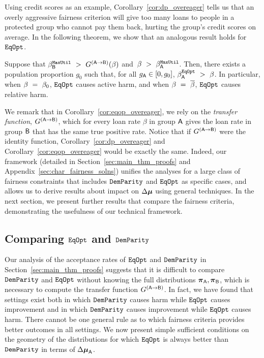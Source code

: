 Using credit scores as an example, Corollary~\ref{cor:dp_overeager} tells us that an overly aggressive fairness criterion will give too many loans to people in a protected group who cannot pay them back, hurting the group's credit scores on average. In the following theorem, we show that an analogous result holds for $\mathtt{EqOpt}$.

\begin{cor} \label{cor:eqop_overeager} Suppose that $\beta_{\mathsf{B}}^{\mathtt{MaxUtil}}~>~G^{(\mathsf{A}\to\mathsf{B})}(\beta)$ and~$\beta~>~\beta_{\mathsf{A}}^{\mathtt{MaxUtil}}$. Then, there exists a population proportion $g_0$ such that, for all $g_{\mathsf{A}}  \in [0,g_0]$, $\beta^{\mathtt{EqOpt}}_{\mathsf{A}}~>~\beta$. In particular, when $\beta~=~\beta_0$, $\mathtt{EqOpt}$ causes active harm, and when $\beta~=~\overline{\beta}$, $\mathtt{EqOpt}$ causes relative harm.
\end{cor} 

We remark that in Corollary~\ref{cor:eqop_overeager}, we rely on the \emph{transfer function}, $G^{(\mathsf{A}\to\mathsf{B})}$, which for every loan rate $\beta$ in group $\mathsf{A}$ gives the loan rate in group $\mathsf{B}$ that has the same true positive rate. Notice that if $G^{(\mathsf{A}\to\mathsf{B})}$ were the identity function, Corollary~\ref{cor:dp_overeager} and Corollary~\ref{cor:eqop_overeager} would be exactly the same. Indeed, our framework (detailed in Section~\ref{sec:main_thm_proofs} and Appendix~\ref{sec:char_fairness_solns}) unifies the analyses for a large class of fairness constraints that includes $\mathtt{DemParity}$ and $\mathtt{EqOpt}$ as specific cases, and allows us to derive results about impact on $\Delta\boldsymbol{\mu}$ using general techniques. 
In the next section, we present further results that compare the fairness criteria, demonstrating the usefulness of our technical framework.


\subsection{Comparing $\mathtt{EqOpt}$ and $\mathtt{DemParity}$}

Our analysis of the acceptance rates of $\mathtt{EqOpt}$ and $\mathtt{DemParity}$ in Section~\ref{sec:main_thm_proofs} suggests that it is difficult to compare $\mathtt{DemParity}$ and $\mathtt{EqOpt}$ without knowing the full distributions $\boldsymbol{\pi}_{\mathsf{A}}, \boldsymbol{\pi}_{\mathsf{B}}$, which is necessary to compute the transfer function $G^{(\mathsf{A}\to\mathsf{B})}$. In fact, we have found that settings exist both in which $\mathtt{DemParity}$ causes harm while $\mathtt{EqOpt}$ causes improvement and in which $\mathtt{DemParity}$ causes improvement while $\mathtt{EqOpt}$ causes harm. There cannot be one general rule as to which fairness criteria provides better outcomes in all settings. We now present simple sufficient conditions on the geometry of the distributions for which $\mathtt{EqOpt}$ is always better than $\mathtt{DemParity}$ in terms of $\Delta\boldsymbol{\mu}_{\mathsf{A}}$.


